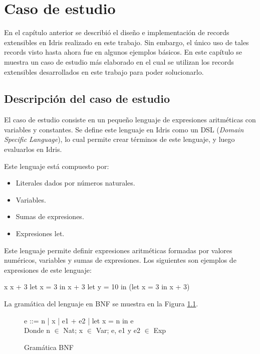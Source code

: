 
\chapter{Caso de estudio}
\label{ch:4}

En el capítulo anterior se describió el diseño e implementación de records extensibles en Idris realizado en este trabajo. Sin embargo, el único uso de tales records visto hasta ahora fue en algunos ejemplos básicos. En este capítulo se muestra un caso de estudio más elaborado en el cual se utilizan los records extensibles desarrollados en este trabajo para poder solucionarlo.

\section{Descripción del caso de estudio}

El caso de estudio consiste en un pequeño lenguaje de expresiones aritméticas con variables y constantes. Se define este lenguaje en Idris como un DSL (\textit{Domain Specific Language}), lo cual permite crear términos de este lenguaje, y luego evaluarlos en Idris.

Este lenguaje está compuesto por:

\begin{itemize}
\item Literales dados por números naturales.
\item Variables.
\item Sumas de expresiones.
\item Expresiones let.
\end{itemize}

Este lenguaje permite definir expresiones aritméticas formadas por valores numéricos, variables y sumas de expresiones. Los siguientes son ejemplos de expresiones de este lenguaje:

\begin{code}
x
x + 3
let x = 3 in x + 3
let y = 10 in (let x = 3 in x + 3)
\end{code}

La gramática del lenguaje en BNF se muestra en la Figura \ref{fig:RulesBNF}.

\begin{figure}[h]

\centering
e ::= n | x | e1 + e2 | let x = n in e\\

Donde n $\in$ Nat; x $\in$ Var; e, e1 y e2 $\in$ Exp
\caption{Gramática BNF}
\label{fig:RulesBNF}
\end{figure}

